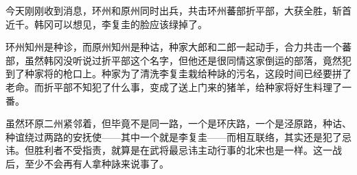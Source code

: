 今天刚刚收到消息，环州和原州同时出兵，共击环州蕃部折平部，大获全胜，斩首近千。韩冈可以想见，李复圭的脸应该绿掉了。

环州知州是种诊，而原州知州是种诂，种家大郎和二郎一起动手，合力共击一个蕃部，虽然韩冈没听说过折平部这个名字，但他还是很同情这家倒运的部落，竟然犯到了种家将的枪口上。种家为了清洗李复圭栽给种詠的污名，这段时间已经要拼了老命。而折平部不知犯了什么事，变成了送上门来的猪羊，给种家将好生料理了一番。

虽然环原二州紧邻着，但毕竟不是同一路，一个是环庆路，一个是泾原路，种诂、种谊绕过两路的安抚使——其中一个就是李复圭——而相互联络，其实还是犯了忌讳。但胜利者不受指责，就算是在武将最忌讳主动行事的北宋也是一样。这一战后，至少不会再有人拿种詠来说事了。

